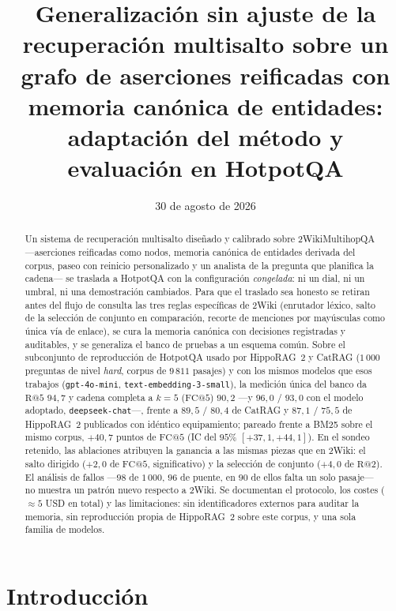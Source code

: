 \documentclass[11pt,a4paper]{article}
\title{Generalización sin ajuste de la recuperación multisalto sobre un grafo
de aserciones reificadas con memoria canónica de entidades:\\
adaptación del método y evaluación en HotpotQA}
\author{}
\date{30 de agosto de 2026}
\newcommand{\hippo}{HippoRAG~2}
\begin{document}
\maketitle
\vspace{-2.5em}

\begin{abstract}
\noindent
Un sistema de recuperación multisalto diseñado y calibrado sobre
2WikiMultihopQA ---aserciones reificadas como nodos, memoria canónica de
entidades derivada del corpus, paseo con reinicio personalizado y un analista
de la pregunta que planifica la cadena--- se traslada a HotpotQA con la
configuración \emph{congelada}: ni un dial, ni un umbral, ni una demostración
cambiados. Para que el traslado sea honesto se retiran antes del flujo de
consulta las tres reglas específicas de 2Wiki (enrutador léxico, salto de la
selección de conjunto en comparación, recorte de menciones por mayúsculas
como única vía de enlace), se cura la memoria canónica con decisiones
registradas y auditables, y se generaliza el banco de pruebas a un esquema
común. Sobre el subconjunto de reproducción de HotpotQA usado por \hippo{} y
CatRAG ($1\,000$ preguntas de nivel \emph{hard}, corpus de $9\,811$ pasajes) y
con los mismos modelos que esos trabajos (\texttt{gpt-4o-mini},
\texttt{text-embedding-3-small}), la medición única del banco da
$\mathrm{R@}5$ $94{,}7$ y cadena completa a $k{=}5$ ($\mathrm{FC@}5$)
$90{,}2$ ---y $96{,}0$ / $93{,}0$ con el modelo adoptado,
\texttt{deepseek-chat}---, frente a $89{,}5$ / $80{,}4$ de CatRAG y $87{,}1$
/ $75{,}5$ de \hippo{} publicados con idéntico equipamiento; pareado frente a BM25 sobre el
mismo corpus, $+40{,}7$ puntos de $\mathrm{FC@}5$ (IC del $95\%$
$[+37{,}1,+44{,}1]$). En el sondeo retenido, las ablaciones atribuyen la
ganancia a las mismas piezas que en 2Wiki: el salto dirigido ($+2{,}0$ de
$\mathrm{FC@}5$, significativo) y la selección de conjunto ($+4{,}0$ de
$\mathrm{R@}2$). El análisis de fallos ---$98$ de $1\,000$, $96$ de puente, en
$90$ de ellos falta un solo pasaje--- no muestra un patrón nuevo respecto a
2Wiki. Se documentan el protocolo, los costes ($\approx 5$ USD en total) y
las limitaciones: sin identificadores externos para auditar la memoria, sin
reproducción propia de \hippo{} sobre este corpus, y una sola familia de
modelos.
\end{abstract}

\section{Introducción}
\label{sec:intro}
\end{document}
